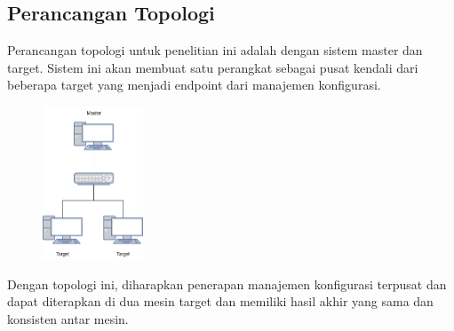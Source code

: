 \documentclass[10pt,]{report}
\begin{document}
\begin{adjustwidth}{20pt}{}
	\subsection{Perancangan Topologi}
	\begin{adjustwidth}{20pt}{}
		\hspace\parindent
		Perancangan topologi untuk penelitian ini adalah dengan sistem master dan
		target. Sistem ini akan membuat satu perangkat sebagai pusat kendali dari
		beberapa target yang menjadi endpoint dari manajemen konfigurasi.\\
		\begin{figure}[H]
			\centering
			\includegraphics[width=3cm]{images/topologi.png}
		\end{figure}
		Dengan topologi ini, diharapkan penerapan manajemen konfigurasi terpusat
		dan dapat diterapkan di dua mesin target dan memiliki hasil akhir yang sama
		dan konsisten antar mesin.\\
	\end{adjustwidth}
\end{adjustwidth}
\end{document}
